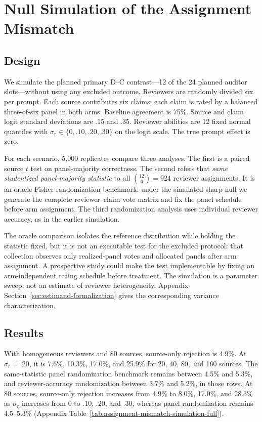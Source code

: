 \documentclass[11pt]{article}
\begin{document}
\section{Null Simulation of the Assignment Mismatch}
\label{sec:simulation}

\subsection{Design}

We simulate the planned primary D--C contrast---12 of the 24 planned auditor
slots---without using any excluded outcome. Reviewers are randomly divided six
per prompt. Each source contributes six claims; each claim is rated by a
balanced three-of-six panel in both arms.
Baseline agreement is 75\%. Source and claim logit standard deviations are
.15 and .35. Reviewer abilities are 12 fixed normal quantiles with
\(\sigma_r\in\{0,.10,.20,.30\}\) on the logit scale. The true prompt effect is
zero.

For each scenario, 5,000 replicates compare three analyses. The first is a
paired source \(t\) test on panel-majority correctness. The second refers that
\emph{same studentized panel-majority statistic} to all
\(\binom{12}{6}=924\) reviewer assignments. It is an oracle Fisher
randomization benchmark: under the simulated sharp null we generate the
complete reviewer--claim vote matrix and fix the panel schedule before arm
assignment. The third randomization analysis uses individual reviewer
accuracy, as in the earlier simulation.

The oracle comparison isolates the reference distribution while holding the
statistic fixed, but it is not an executable test for the excluded protocol:
that collection observes only realized-panel votes and allocated panels after
arm assignment. A prospective study could make the test implementable by
fixing an arm-independent rating schedule before treatment. The simulation is
a parameter sweep, not an estimate of reviewer heterogeneity. Appendix
Section~\ref{sec:estimand-formalization} gives the corresponding variance
characterization.



\subsection{Results}

With homogeneous reviewers and 80 sources, source-only rejection is 4.9\%.
At \(\sigma_r=.20\), it is 7.6\%, 10.3\%, 17.0\%, and 25.9\% for 20, 40, 80,
and 160 sources. The same-statistic panel randomization benchmark remains
between 4.5\% and 5.3\%, and reviewer-accuracy randomization between 3.7\% and
5.2\%, in those rows. At 80 sources, source-only rejection increases from
4.9\% to 8.0\%, 17.0\%, and 28.3\% as \(\sigma_r\) increases from 0 to .10,
.20, and .30, whereas panel randomization remains 4.5--5.3\%
(Appendix Table~\ref{tab:assignment-mismatch-simulation-full}).
\end{document}
